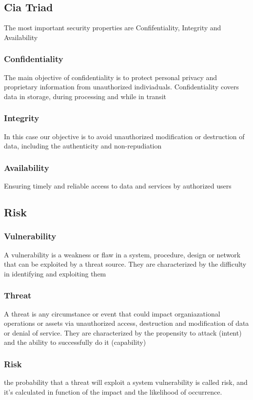 \documentclass[12pt, a4paper]{article}
\begin{document}
\subsection{Cia Triad}
The most important security properties are Confifentiality, Integrity and Availability

\subsubsection*{Confidentiality}
The main objective of confidentiality is to protect personal privacy and proprietary information from unauthorized indiviaduals.
Confidentiality covers data in storage, during processing and while in transit

\subsubsection*{Integrity}
In this case our objective is to avoid unauthorized modification or destruction of data, including the authenticity and non-repudiation

\subsubsection*{Availability}
Ensuring timely and reliable access to data and services by authorized users

\subsection{Risk}
\subsubsection*{Vulnerability}
A vulnerability is a weakness or flaw in a system, procedure, design or network that can be exploited by a threat source.
They are characterized by the difficulty in identifying and exploiting them

\subsubsection*{Threat}
A threat is any circumstance or event that could impact organiazational operations or assets via unauthorized access, destruction and 
modification of data or denial of service. They are characterized by the propensity to attack (intent) and the ability to successfully do it (capability)

\subsubsection*{Risk}
the probability that a threat will exploit a system vulnerability is called risk, and it's calculated in function of the impact and 
the likelihood of occurrence.
\end{document}
